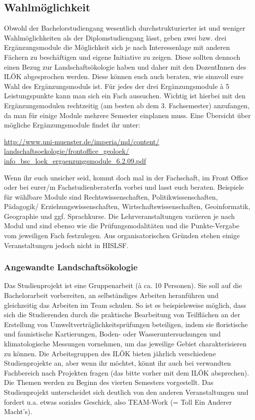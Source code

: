\subsection*{Wahlmöglichkeit}
Obwohl der Bachelorstudiengang wesentlich durchstrukturierter ist und weniger Wahlmöglichkeiten als der Diplomstudiengang lässt, geben zwei bzw. drei Ergänzungsmodule die Möglichkeit sich je nach Interessenlage mit anderen Fächern zu beschäftigen und eigene Initiative zu zeigen. Diese sollten dennoch einen Bezug zur Landschaftsökologie haben und daher mit den DozentInnen des ILÖK abgesprochen werden. Diese können euch auch beraten, wie sinnvoll eure Wahl des Ergänzungsmoduls ist. Für jedes der drei Ergänzungsmodule à 5 Leistungspunkte kann man sich ein Fach aussuchen. Wichtig ist hierbei mit den Ergänzungsmodulen rechtzeitig (am besten ab dem 3. Fachsemester) anzufangen, da man für einige Module mehrere Semester einplanen muss. Eine Übersicht über mögliche Ergänzungsmodule ﬁndet ihr unter:

\url{http://www.uni-muenster.de/imperia/md/content/}\\\url{landschaftsoekologie/frontoffice_geoloek/}\\\url{info_bsc_loek_ergaenzungsmodule_6.2.09.pdf}

Wenn ihr euch unsicher seid, kommt doch mal in der Fachschaft, im Front Office oder bei eurer/m FachstudienberaterIn vorbei und lasst euch beraten. Beispiele für wählbare Module sind Rechtswissenschaften, Politikwissenschaften, Pädagogik/ Erziehungswissenschaften, Wirtschaftswissenschaften, Geoinformatik, Geographie und ggf. Sprachkurse. Die Lehrveranstaltungen variieren je nach Modul und sind ebenso wie die Prüfungsmodalitäten und die Punkte-Vergabe vom jeweiligen Fach festzulegen. Aus organisatorischen Gründen stehen einige Veranstaltungen jedoch nicht in HISLSF.

\subsubsection*{Angewandte Landschaftsökologie}
Das Studienprojekt ist eine Gruppenarbeit (à ca. 10 Personen). Sie soll auf die Bachelorarbeit vorbereiten, an selbständiges Arbeiten heranführen und gleichzeitig das Arbeiten im Team schulen. So ist es beispielsweise möglich, dass sich die Studierenden durch die praktische Bearbeitung von Teilﬂächen an der Erstellung von Umweltverträglichkeitsprüfungen beteiligen, indem sie ﬂoristische und faunistische Kartierungen, Boden- oder Wasseruntersuchungen und klimatologische Messungen vornehmen, um das jeweilige Gebiet charakterisieren zu können. Die Arbeitsgruppen des ILÖK bieten jährlich verschiedene Studienprojekte an, aber wenn ihr möchtet, könnt ihr auch bei verwandten Fachbereich nach Projekten fragen (das bitte vorher mit dem ILÖK absprechen). Die Themen werden zu Beginn des vierten Semesters vorgestellt. Das Studienprojekt unterscheidet sich deutlich von den anderen Veranstaltungen und fordert u.a. etwas soziales Geschick, also TEAM-Work (= Toll Ein Anderer Macht’s).

